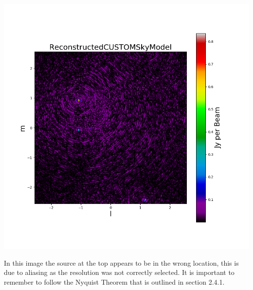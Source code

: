 \begin{center}
    \includegraphics[scale=0.4]{images/RECON_KAT_7_4_POINT_ALIASING.png}
\end{center}
In this image the source at the top appears to be in the wrong location, this is due to aliasing as the resolution was not correctly selected. It is important to remember to follow the Nyquist Theorem that is outlined in section 2.4.1.

